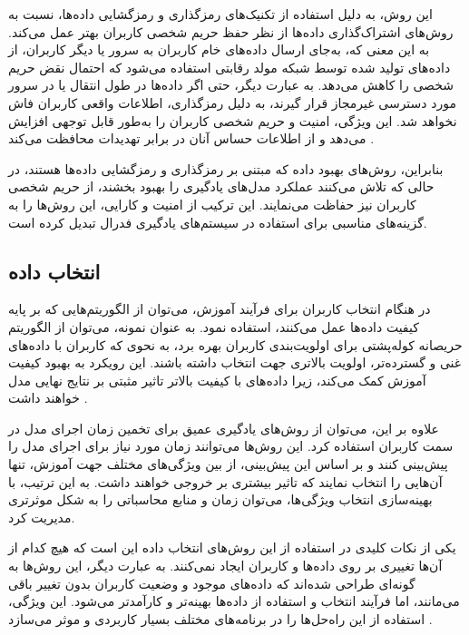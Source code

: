 این روش، به دلیل استفاده از تکنیک‌های رمزگذاری%
و رمزگشایی%
داده‌ها، نسبت به روش‌های اشتراک‌گذاری داده‌ها از نظر حفظ حریم شخصی کاربران بهتر عمل می‌کند. به این معنی که، به‌جای ارسال داده‌های خام کاربران به سرور یا دیگر کاربران، از داده‌های تولید شده توسط شبکه مولد رقابتی استفاده می‌شود که احتمال نقض حریم شخصی را کاهش می‌دهد.
به عبارت دیگر، حتی اگر داده‌ها در طول انتقال یا در سرور مورد دسترسی غیرمجاز قرار گیرند، به دلیل رمزگذاری، اطلاعات واقعی کاربران فاش نخواهد شد. این ویژگی، امنیت و حریم شخصی کاربران را به‌طور قابل توجهی افزایش می‌دهد و از اطلاعات حساس آنان در برابر تهدیدات محافظت می‌کند
\cite{jeong2018communication}.

بنابراین، روش‌های بهبود داده که مبتنی بر رمزگذاری و رمزگشایی داده‌ها هستند،
در حالی که تلاش می‌کنند عملکرد مدل‌های یادگیری را بهبود بخشند،
از حریم شخصی کاربران نیز حفاظت می‌نمایند. این ترکیب از امنیت و کارایی، این روش‌ها را به گزینه‌های مناسبی برای استفاده در سیستم‌های یادگیری فدرال تبدیل کرده است.


\subsection{انتخاب داده}
در هنگام انتخاب کاربران برای فرآیند آموزش، می‌توان از الگوریتم‌هایی که بر پایه کیفیت داده‌ها عمل می‌کنند، استفاده نمود. به عنوان نمونه، می‌توان از الگوریتم حریصانه کوله‌پشتی برای اولویت‌بندی کاربران بهره برد، به نحوی که کاربران با داده‌های غنی و گسترده‌تر، اولویت بالاتری جهت انتخاب داشته باشند. این رویکرد به بهبود کیفیت آموزش کمک می‌کند، زیرا داده‌های با کیفیت بالاتر تاثیر مثبتی بر نتایج نهایی مدل خواهند داشت
\cite{taik2021data}.

علاوه بر این، می‌توان از روش‌های یادگیری عمیق برای تخمین زمان اجرای مدل در سمت کاربران استفاده کرد. این روش‌ها می‌توانند زمان مورد نیاز برای اجرای مدل را پیش‌بینی کنند و بر اساس این پیش‌بینی، از بین ویژگی‌های مختلف جهت آموزش، تنها آن‌هایی را انتخاب نمایند که تاثیر بیشتری بر خروجی خواهند داشت. به این ترتیب، با بهینه‌سازی انتخاب ویژگی‌ها، می‌توان زمان و منابع محاسباتی را به شکل موثرتری مدیریت کرد.

یکی از نکات کلیدی در استفاده از این روش‌های انتخاب داده این است که هیچ کدام از آن‌ها تغییری بر روی داده‌ها و کاربران ایجاد نمی‌کنند. به عبارت دیگر، این روش‌ها به گونه‌ای طراحی شده‌اند که داده‌های موجود و وضعیت کاربران بدون تغییر باقی می‌مانند، اما فرآیند انتخاب و استفاده از داده‌ها بهینه‌تر و کارآمدتر می‌شود. این ویژگی، استفاده از این راه‌حل‌ها را در برنامه‌های مختلف بسیار کاربردی و موثر می‌سازد
\cite{zeng2022local}.

